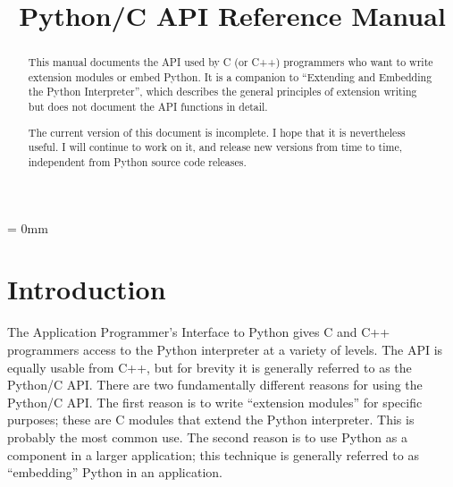 
\title{Python/C API Reference Manual}



\makeindex			%





\maketitle



\begin{abstract}

\noindent
This manual documents the API used by C (or C++) programmers who want
to write extension modules or embed Python.  It is a companion to
``Extending and Embedding the Python Interpreter'', which describes
the general principles of extension writing but does not document the
API functions in detail.

 The current version of this document is incomplete.
I hope that it is nevertheless useful.  I will continue to work on it,
and release new versions from time to time, independent from Python
source code releases.

\end{abstract}

\pagebreak

{
\parskip = 0mm
\tableofcontents
}

\pagebreak



\chapter{Introduction}

The Application Programmer's Interface to Python gives C and C++
programmers access to the Python interpreter at a variety of levels.
The API is equally usable from C++, but for brevity it is generally
referred to as the Python/C API.  There are two fundamentally
different reasons for using the Python/C API.  The first reason is to
write ``extension modules'' for specific purposes; these are C modules
that extend the Python interpreter.  This is probably the most common
use.  The second reason is to use Python as a component in a larger
application; this technique is generally referred to as ``embedding''
Python in an application.


